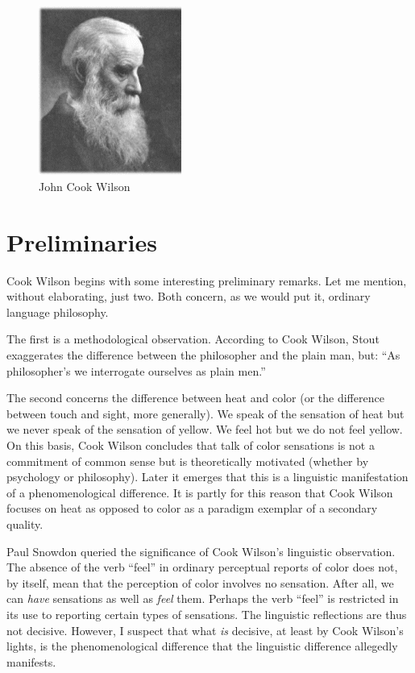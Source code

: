 \documentclass[11pt]{article}
\title{\mytitle\\
\mysubtitle}
\author{\myauthor}
\date{} %
\begin{document}
\maketitle

\setlength{\parindent}{1em}


\begin{figure}[htbp]
	\centering
		\includegraphics[scale=1]{../../graphics/wilson.jpg}
	\caption{John Cook Wilson}
	\label{fig:wilson}
\end{figure}

\section{Preliminaries} %
\label{sec:preliminaries}

Cook Wilson begins with some interesting preliminary remarks. Let me mention, without elaborating, just two. Both concern, as we would put it, ordinary language philosophy. 

The first is a methodological observation. According to Cook Wilson, Stout exaggerates the difference between the philosopher and the plain man, but: ``As philosopher's we interrogate ourselves as plain men.'' 

The second concerns the difference between heat and color (or the difference between touch and sight, more generally). We speak of the sensation of heat but we never speak of the sensation of yellow. We feel hot but we do not feel yellow. On this basis, Cook Wilson concludes that talk of color sensations is not a commitment of common sense but is theoretically motivated (whether by psychology or philosophy). Later it emerges that this is a linguistic manifestation of a phenomenological difference. It is partly for this reason that Cook Wilson focuses on heat as opposed to color as a paradigm exemplar of a secondary quality.

\begin{discussion}
    Paul Snowdon queried the significance of Cook Wilson's linguistic observation. The absence of the verb ``feel'' in ordinary perceptual reports of color does not, by itself, mean that the perception of color involves no sensation. After all, we can \emph{have} sensations as well as \emph{feel} them. Perhaps the verb ``feel'' is restricted in its use to reporting certain types of sensations. The linguistic reflections are thus not decisive. However, I suspect that what \emph{is} decisive, at least by Cook Wilson's lights, is the phenomenological difference that the linguistic difference allegedly manifests.
\end{discussion}
\end{document}
